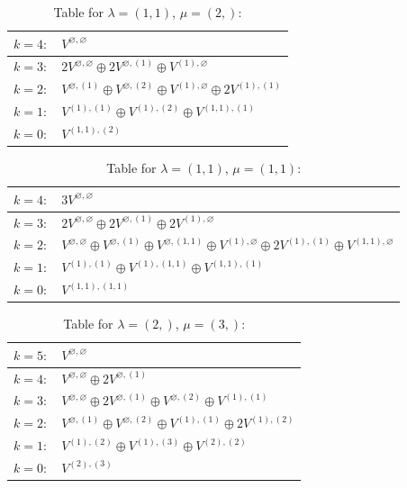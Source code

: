 \renewcommand{\arraystretch}{1.6} 
\begin{table}[H]
\centering
\caption{Table for $\lambda = (1, 1)$, $\mu = (2,)$:}
\begin{tabular}{|>{\centering\arraybackslash}p{15cm}|}
\hline
 $k = 4: \quad V^{\varnothing, \varnothing} $ \\ \hline
 $k = 3: \quad 2 V^{\varnothing, \varnothing} \oplus 2 V^{\varnothing, (1)} \oplus V^{(1), \varnothing} $ \\ \hline
 $k = 2: \quad V^{\varnothing, (1)} \oplus V^{\varnothing, (2)} \oplus V^{(1), \varnothing} \oplus 2 V^{(1), (1)} $ \\ \hline
 $k = 1: \quad V^{(1), (1)} \oplus V^{(1), (2)} \oplus V^{(1, 1), (1)} $ \\ \hline
 $k = 0: \quad V^{(1, 1), (2)} $ \\ \hline
\end{tabular}
\end{table}

\renewcommand{\arraystretch}{1.6} 
\begin{table}[H]
\centering
\caption{Table for $\lambda = (1, 1)$, $\mu = (1, 1)$:}
\begin{tabular}{|>{\centering\arraybackslash}p{15cm}|}
\hline
 $k = 4: \quad 3 V^{\varnothing, \varnothing} $ \\ \hline
 $k = 3: \quad 2 V^{\varnothing, \varnothing} \oplus 2 V^{\varnothing, (1)} \oplus 2 V^{(1), \varnothing} $ \\ \hline
 $k = 2: \quad V^{\varnothing, \varnothing} \oplus V^{\varnothing, (1)} \oplus V^{\varnothing, (1, 1)} \oplus V^{(1), \varnothing} \oplus 2 V^{(1), (1)} \oplus V^{(1, 1), \varnothing} $ \\ \hline
 $k = 1: \quad V^{(1), (1)} \oplus V^{(1), (1, 1)} \oplus V^{(1, 1), (1)} $ \\ \hline
 $k = 0: \quad V^{(1, 1), (1, 1)} $ \\ \hline
\end{tabular}
\end{table}

\renewcommand{\arraystretch}{1.6} 
\begin{table}[H]
\centering
\caption{Table for $\lambda = (2,)$, $\mu = (3,)$:}
\begin{tabular}{|>{\centering\arraybackslash}p{15cm}|}
\hline
 $k = 5: \quad V^{\varnothing, \varnothing} $ \\ \hline
 $k = 4: \quad V^{\varnothing, \varnothing} \oplus 2 V^{\varnothing, (1)} $ \\ \hline
 $k = 3: \quad V^{\varnothing, \varnothing} \oplus 2 V^{\varnothing, (1)} \oplus V^{\varnothing, (2)} \oplus V^{(1), (1)} $ \\ \hline
 $k = 2: \quad V^{\varnothing, (1)} \oplus V^{\varnothing, (2)} \oplus V^{(1), (1)} \oplus 2 V^{(1), (2)} $ \\ \hline
 $k = 1: \quad V^{(1), (2)} \oplus V^{(1), (3)} \oplus V^{(2), (2)} $ \\ \hline
 $k = 0: \quad V^{(2), (3)} $ \\ \hline
\end{tabular}
\end{table}

